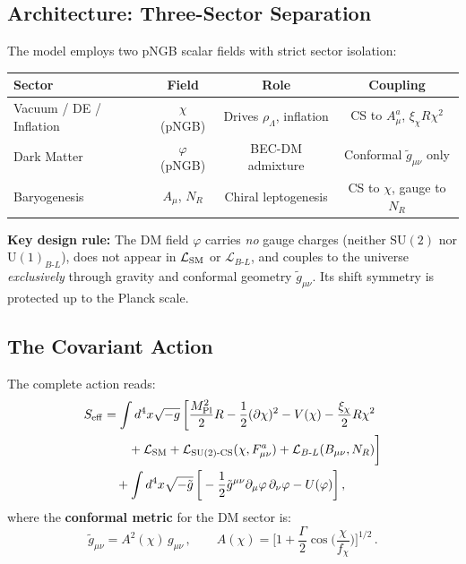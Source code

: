 \documentclass[a4paper,11pt]{article}
\newcommand{\MPl}{M_{\rm Pl}}
\newcommand{\chif}{\chi}
\newcommand{\phif}{\varphi}
\newcommand{\fchi}{f_\chi}
\newcommand{\UBL}{\mathrm{U}(1)_{B\text{-}L}}
\newcommand{\SUt}{\mathrm{SU}(2)}
\begin{document}
\subsection{Architecture: Three-Sector Separation}

The model employs two pNGB scalar fields with strict sector isolation:

\begin{center}
\begin{tabular}{lccc}
\toprule
\textbf{Sector} & \textbf{Field} & \textbf{Role} & \textbf{Coupling} \\
\midrule
Vacuum / DE / Inflation & $\chif$ (pNGB) & Drives $\rho_\Lambda$, inflation & CS to $A^a_\mu$, $\xi_\chif R\chif^2$ \\
Dark Matter & $\phif$ (pNGB) & BEC-DM admixture & Conformal $\tilde{g}_{\mu\nu}$ only \\
Baryogenesis & $A_\mu$, $N_R$ & Chiral leptogenesis & CS to $\chif$, gauge to $N_R$ \\
\bottomrule
\end{tabular}
\end{center}

\noindent \textbf{Key design rule:} The DM field $\phif$ carries \textit{no} gauge charges (neither $\SUt$ nor $\UBL$), does not appear in $\mathcal{L}_{\rm SM}$ or $\mathcal{L}_{B\text{-}L}$, and couples to the universe \textit{exclusively} through gravity and conformal geometry $\tilde{g}_{\mu\nu}$. Its shift symmetry is protected up to the Planck scale.

\subsection{The Covariant Action}

The complete action reads:
\begin{align}
S_{\rm eff} &= \int d^4x \sqrt{-g}\,\bigg[\frac{\MPl^2}{2} R - \frac{1}{2}(\partial\chif)^2 - V(\chif) - \frac{\xi_\chif}{2}R\chif^2 \nonumber\\
&\qquad + \mathcal{L}_{\rm SM} + \mathcal{L}_{\SUt\text{-CS}}(\chif, F^a_{\mu\nu}) + \mathcal{L}_{B\text{-}L}(B_{\mu\nu}, N_R)\bigg] \nonumber\\
&\quad + \int d^4x \sqrt{-\tilde{g}}\,\bigg[-\frac{1}{2}\tilde{g}^{\mu\nu}\partial_\mu\phif\,\partial_\nu\phif - U(\phif)\bigg]\,,
\label{eq:action}
\end{align}
where the \textbf{conformal metric} for the DM sector is:
\begin{equation}
\tilde{g}_{\mu\nu} = A^2(\chif)\, g_{\mu\nu}\,,\qquad A(\chif) = \bigg[1 + \frac{\Gamma}{2}\cos\!\bigg(\frac{\chif}{\fchi}\bigg)\bigg]^{1/2}\,.
\label{eq:conformal}
\end{equation}
\end{document}

